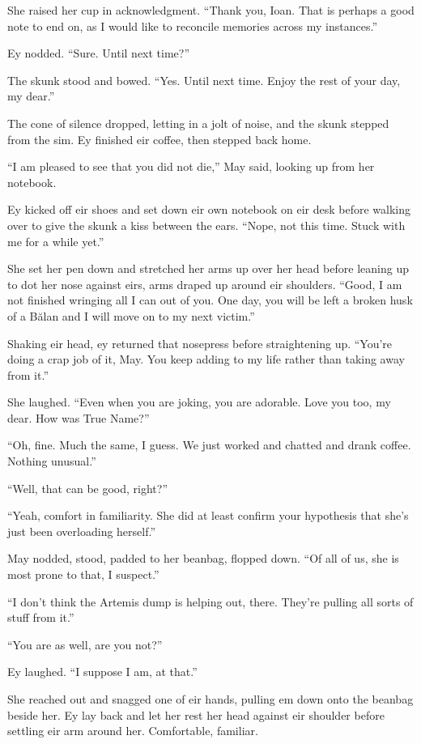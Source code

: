 She raised her cup in acknowledgment. ``Thank you, Ioan. That is perhaps a good note to end on, as I would like to reconcile memories across my instances.''

Ey nodded. ``Sure. Until next time?''

The skunk stood and bowed. ``Yes. Until next time. Enjoy the rest of your day, my dear.''

The cone of silence dropped, letting in a jolt of noise, and the skunk stepped from the sim. Ey finished eir coffee, then stepped back home.

``I am pleased to see that you did not die,'' May said, looking up from her notebook.

Ey kicked off eir shoes and set down eir own notebook on eir desk before walking over to give the skunk a kiss between the ears. ``Nope, not this time. Stuck with me for a while yet.''

She set her pen down and stretched her arms up over her head before leaning up to dot her nose against eirs, arms draped up around eir shoulders. ``Good, I am not finished wringing all I can out of you. One day, you will be left a broken husk of a Bălan and I will move on to my next victim.''

Shaking eir head, ey returned that nosepress before straightening up. ``You're doing a crap job of it, May. You keep adding to my life rather than taking away from it.''

She laughed. ``Even when you are joking, you are adorable. Love you too, my dear. How was True Name?''

``Oh, fine. Much the same, I guess. We just worked and chatted and drank coffee. Nothing unusual.''

``Well, that can be good, right?''

``Yeah, comfort in familiarity. She did at least confirm your hypothesis that she's just been overloading herself.''

May nodded, stood, padded to her beanbag, flopped down. ``Of all of us, she is most prone to that, I suspect.''

``I don't think the Artemis dump is helping out, there. They're pulling all sorts of stuff from it.''

``You are as well, are you not?''

Ey laughed. ``I suppose I am, at that.''

She reached out and snagged one of eir hands, pulling em down onto the beanbag beside her. Ey lay back and let her rest her head against eir shoulder before settling eir arm around her. Comfortable, familiar.

